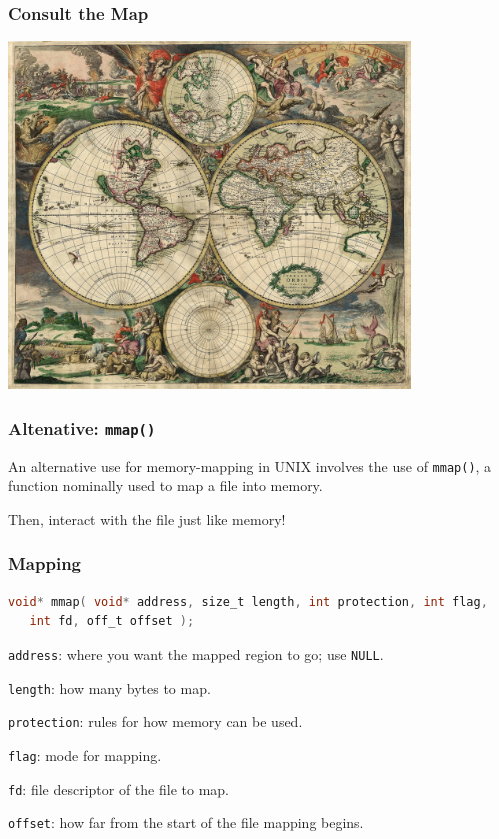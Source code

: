 \begin{frame}
	\frametitle{Consult the Map}

	\begin{center}
		\includegraphics[width=0.8\textwidth]{images/worldmap.jpg}
	\end{center}


\end{frame}


\begin{frame}
	\frametitle{Altenative: \texttt{mmap()}}

	An alternative use for memory-mapping in UNIX involves the use of \texttt{mmap()}, a function nominally used to map a file into memory.

	Then, interact with the file just like memory!

\end{frame}


\begin{frame}[fragile]
	\frametitle{Mapping}
	\begin{lstlisting}[language=C]
void* mmap( void* address, size_t length, int protection, int flag,
   int fd, off_t offset );
\end{lstlisting}

	\texttt{address}: where you want the mapped region to go; use \texttt{NULL}.

	\texttt{length}: how many bytes to map.

	\texttt{protection}: rules for how memory can be used.

	\texttt{flag}: mode for mapping.

	\texttt{fd}: file descriptor of the file to map.

	\texttt{offset}: how far from the start of the file mapping begins.

\end{frame}


